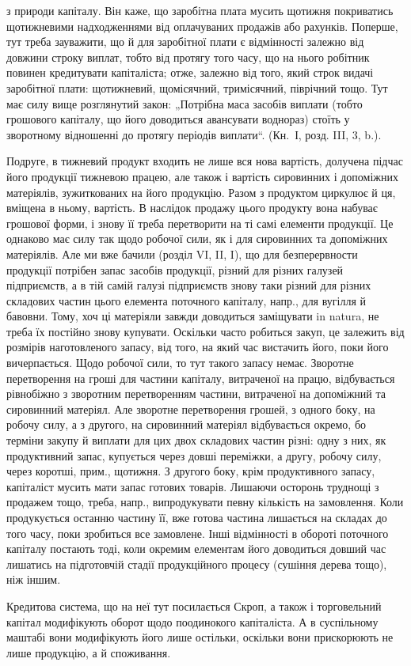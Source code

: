 \parcont{}  %
з природи капіталу. Він каже, що заробітна плата мусить щотижня покриватись
щотижневими надходженнями від оплачуваних продажів або рахунків.
Поперше, тут треба зауважити, що й для заробітної плати є
відмінності залежно від довжини строку виплат, тобто від протягу
того часу, що на нього робітник повинен кредитувати капіталіста; отже,
залежно від того, який строк видачі заробітної плати: щотижневий,
щомісячний, тримісячний, піврічний тощо. Тут має силу вище розглянутий
закон: „Потрібна маса засобів виплати (тобто грошового капіталу, що
його доводиться авансувати воднораз) стоїть у зворотному відношенні
до протягу періодів виплати“. (Кн.~І, розд. III, 3, b.).

Подруге, в тижневий продукт входить не лише вся нова вартість, долучена
підчас його продукції тижневою працею, але також і вартість сировинних
і допоміжних матеріялів, зужиткованих на його продукцію. Разом
з продуктом циркулює й ця, вміщена в ньому, вартість. В наслідок продажу
цього продукту вона набуває грошової форми, і знову її треба
перетворити на ті самі елементи продукції. Це однаково має силу так
щодо робочої сили, як і для сировинних та допоміжних матеріялів. Але
ми вже бачили (розділ VI, II, I), що для безперервности продукції потрібен
запас засобів продукції, різний для різних галузей підприємств,
а в тій самій галузі підприємств знову таки різний для різних складових
частин цього елемента поточного капіталу, напр., для вугілля й бавовни.
Тому, хоч ці матеріяли завжди доводиться заміщувати in natura, не треба
їх постійно знову купувати. Оскільки часто робиться закуп, це залежить
від розмірів наготовленого запасу, від того, на який час вистачить його,
поки його вичерпається. Щодо робочої сили, то тут такого запасу немає.
Зворотне перетворення на гроші для частини капіталу, витраченої на
працю, відбувається рівнобіжно з зворотним перетворенням частини, витраченої
на допоміжний та сировинний матеріял. Але зворотне перетворення
грошей, з одного боку, на робочу силу, а з другого, на сировинний
матеріял відбувається окремо, бо терміни закупу й виплати для цих двох
складових частин різні: одну з них, як продуктивний запас, купується
через довші переміжки, а другу, робочу силу, через коротші, прим.,
щотижня. З другого боку, крім продуктивного запасу, капіталіст мусить
мати запас готових товарів. Лишаючи осторонь труднощі з продажем
тощо, треба, напр., випродукувати певну кількість на замовлення. Коли
продукується останню частину її, вже готова частина лишається на складах
до того часу, поки зробиться все замовлене. Інші відмінності в обороті
поточного капіталу постають тоді, коли окремим елементам його
доводиться довший час лишатись на підготовчій стадії продукційного
процесу (сушіння дерева тощо), ніж іншим.

Кредитова система, що на неї тут посилається Скроп, а також і торговельний
капітал модифікують оборот щодо поодинокого капіталіста.
А в суспільному маштабі вони модифікують його лише остільки, оскільки
вони прискорюють не лише продукцію, а й споживання.
